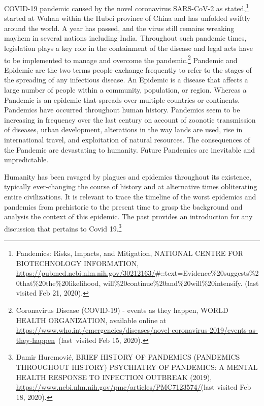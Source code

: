 \begin{multicols}{2}
\noi
COVID-19 pandemic caused by the novel coronavirus SARS-CoV-2 as stated,\footnote{Pandemics: Risks, Impacts, and Mitigation, NATIONAL CENTRE FOR BIOTECHNOLOGY INFORMATION,\\
 \url{https://pubmed.ncbi.nlm.nih.gov/30212163/}\#::text=Evidence\%20suggests\%20that\%20the\%20likelihood, will\%20continue\%20and\%20will\%20intensify. (last visited Feb 21, 2020).} started at
Wuhan within the Hubei province of China and has unfolded swiftly around the world. A
year has passed, and the virus still remains wreaking mayhem in several nations including
India. Throughout such pandemic times, legislation plays a key role in the containment of the
disease and legal acts have to be implemented to manage and overcome the pandemic.\footnote{Coronavirus Disease (COVID-19) - events as they happen, WORLD HEALTH ORGANIZATION, available online at\\ \url{https://www.who.int/emergencies/diseases/novel-coronavirus-2019/events-as-they-happen}~(last~visited Feb 15, 2020).}
Pandemic and Epidemic are the two terms people exchange frequently to refer to the stages
of the spreading of any infectious disease. An Epidemic is a disease that affects a large
number of people within a community, population, or region. Whereas a Pandemic is an
epidemic that spreads over multiple countries or continents. Pandemics have occurred
throughout human history. Pandemics seem to be increasing in frequency over the last
century on account of zoonotic transmission of diseases, urban development, alterations in
the way lands are used, rise in international travel, and exploitation of natural resources. The 
consequences of the Pandemic are devastating to humanity. Future Pandemics are inevitable
and unpredictable.

\noi
Humanity has been ravaged by plagues and epidemics throughout its existence, typically
ever-changing the course of history and at alternative times obliterating entire civilizations. It
is relevant to trace the timeline of the worst epidemics and pandemics from prehistoric to the
present time to grasp the background and analysis the context of this epidemic. The past
provides an introduction for any discussion that pertains to Covid 19.\footnote{Damir Huremović, BRIEF HISTORY OF PANDEMICS (PANDEMICS THROUGHOUT HISTORY) PSYCHIATRY OF PANDEMICS: A MENTAL HEALTH RESPONSE TO INFECTION OUTBREAK (2019), \url{https://www.ncbi.nlm.nih.gov/pmc/articles/PMC7123574/}(last visited Feb 18, 2020).}


\end{multicols}
